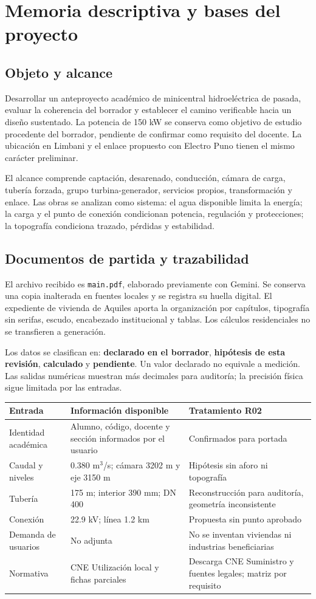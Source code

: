 \chapter{Memoria descriptiva y bases del proyecto}
\section{Objeto y alcance}
Desarrollar un anteproyecto académico de minicentral hidroeléctrica de pasada, evaluar la coherencia del borrador y establecer el camino verificable hacia un diseño sustentado. La potencia de 150 kW se conserva como objetivo de estudio procedente del borrador, pendiente de confirmar como requisito del docente. La ubicación en Limbani y el enlace propuesto con Electro Puno tienen el mismo carácter preliminar.

El alcance comprende captación, desarenado, conducción, cámara de carga, tubería forzada, grupo turbina-generador, servicios propios, transformación y enlace. Las obras se analizan como sistema: el agua disponible limita la energía; la carga y el punto de conexión condicionan potencia, regulación y protecciones; la topografía condiciona trazado, pérdidas y estabilidad.

\section{Documentos de partida y trazabilidad}
El archivo recibido es \texttt{main.pdf}, elaborado previamente con Gemini. Se conserva una copia inalterada en fuentes locales y se registra su huella digital. El expediente de vivienda de Aquiles aporta la organización por capítulos, tipografía sin serifas, escudo, encabezado institucional y tablas. Los cálculos residenciales no se transfieren a generación.

Los datos se clasifican en: \textbf{declarado en el borrador}, \textbf{hipótesis de esta revisión}, \textbf{calculado} y \textbf{pendiente}. Un valor declarado no equivale a medición. Las salidas numéricas muestran más decimales para auditoría; la precisión física sigue limitada por las entradas.

\begin{longtable}{L{4cm}L{5cm}L{5.4cm}}
\toprule Entrada & Información disponible & Tratamiento R02\\\midrule
Identidad académica & Alumno, código, docente y sección informados por el usuario & Confirmados para portada\\
Caudal y niveles & 0.380 m$^3$/s; cámara 3202 m y eje 3150 m & Hipótesis sin aforo ni topografía\\
Tubería & 175 m; interior 390 mm; DN 400 & Reconstrucción para auditoría, geometría inconsistente\\
Conexión & 22.9 kV; línea 1.2 km & Propuesta sin punto aprobado\\
Demanda de usuarios & No adjunta & No se inventan viviendas ni industrias beneficiarias\\
Normativa & CNE Utilización local y fichas parciales & Descarga CNE Suministro y fuentes legales; matriz por requisito\\
\bottomrule
\end{longtable}


